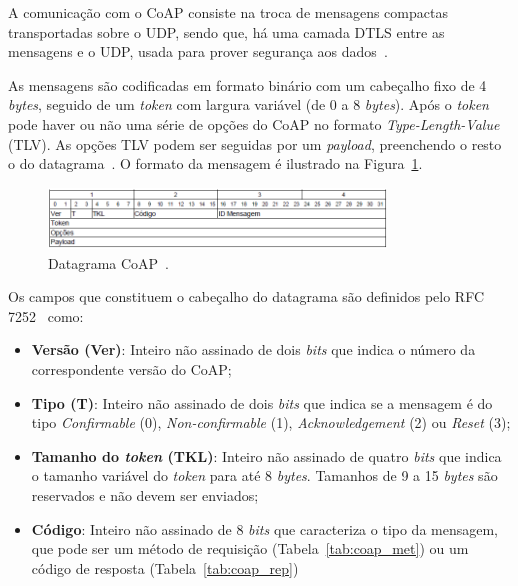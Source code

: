  A comunicação com o CoAP consiste na troca de mensagens compactas transportadas sobre o UDP, sendo que, há uma camada DTLS entre as mensagens e o UDP, usada para prover segurança aos dados~\cite{shelby2014constrained}. 
 
 As mensagens são codificadas em formato binário com um cabeçalho fixo de 4 \textit{bytes}, seguido de um \textit{token} com largura variável (de 0 a 8 \textit{bytes}). Após o \textit{token} pode haver ou não uma série de opções do CoAP no formato \textit{Type-Length-Value} (TLV). As opções TLV podem ser seguidas por um \textit{payload}, preenchendo o resto o do datagrama~\cite{shelby2014constrained}. O formato da mensagem é ilustrado na Figura~\ref{fig:coap_header}.
 
 \begin{figure}[ht]
\centering
\includegraphics[width=0.8\textwidth]{imagens/coap_header.png}
\caption{Datagrama CoAP~\cite{shelby2014constrained}.
\label{fig:coap_header}}
\end{figure}
\FloatBarrier

Os campos que constituem o cabeçalho do datagrama são definidos pelo RFC 7252~\cite{shelby2014constrained} como:

\begin{itemize}
	\item \textbf{Versão (Ver)}: Inteiro não assinado de dois \textit{bits} que indica o número da correspondente versão do CoAP;
	\item \textbf{Tipo (T)}: Inteiro não assinado de dois \textit{bits} que indica se a mensagem é do tipo \textit{Confirmable} (0), \textit{Non-confirmable} (1), \textit{Acknowledgement} (2) ou \textit{Reset} (3);
	\item \textbf{Tamanho do \textit{token} (TKL)}: Inteiro não assinado de quatro \textit{bits} que indica o tamanho variável do \textit{token} para até 8 \textit{bytes}. Tamanhos de 9 a 15 \textit{bytes} são reservados e não devem ser enviados;
	\item \textbf{Código}: Inteiro não assinado de 8 \textit{bits} que caracteriza o tipo da mensagem, que pode ser um método de requisição (Tabela~\ref{tab:coap_met}) ou um código de resposta (Tabela~\ref{tab:coap_rep})   
\end{itemize}

